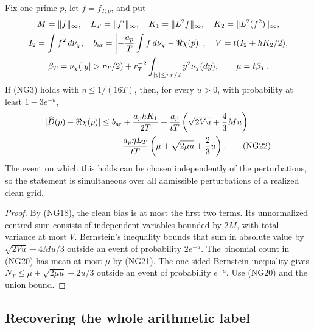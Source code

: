 \begin{proposition}
\label{prop:grid-confidence}
Fix one prime $p$, let $f=f_{T,p}$, and put
\begin{gather*}
 M=\|f\|_\infty,\quad L_T=\|f'\|_\infty,
 \quad K_1=\|L^2f\|_\infty,\quad K_2=\|L^2(f^2)\|_\infty,\\
 I_2=\int f^2\,d\nu_\chi,\quad
 b_{\rm ar}=\left|-\frac{a_p}T\int f\,d\nu_\chi-\Re\chi(p)\right|,\quad
 V=t(I_2+hK_2/2),\\
 \beta_T=\nu_\chi(|y|>r_T/2)+
         r_T^{-2}\int_{|y|\le r_T/2}y^2\nu_\chi(dy),
 \qquad \mu=t\beta_T.
\end{gather*}
If (NG3) holds with $\eta\le1/(16T)$, then, for every $u>0$, with
probability at least $1-3e^{-u}$,
\begin{align*}
 |\widehat D(p)-\Re\chi(p)|\le {}&b_{\rm ar}
              +\frac{a_phK_1}{2T}
              +\frac{a_p}{tT}
                     \left(\sqrt{2Vu}+\frac43Mu\right)\\
 &+\frac{a_p\eta L_T}{tT}
                     \left(\mu+\sqrt{2\mu u}+\frac23u\right).
                                                               \tag{NG22}
\end{align*}
The event on which this holds can be chosen independently of the
perturbations, so the statement is simultaneous over all admissible
perturbations of a realized clean grid.
\end{proposition}

\begin{proof}
By (NG18), the clean bias is at most the first two terms.  Its unnormalized
centred sum consists of independent variables bounded by $2M$, with total
variance at most $V$.  Bernstein's inequality bounds that sum in absolute
value by $\sqrt{2Vu}+4Mu/3$ outside an event of probability $2e^{-u}$.
The binomial count in (NG20) has mean at most $\mu$ by (NG21).
The one-sided Bernstein inequality gives
$N_T\le\mu+\sqrt{2\mu u}+2u/3$ outside an event of probability $e^{-u}$.
Use (NG20) and the union bound.
\end{proof}

\subsection{Recovering the whole arithmetic label}

